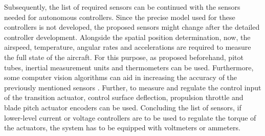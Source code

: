 Subsequently, the list of required sensors can be continued with the sensors needed for autonomous controllers.
Since the precise model used for these controllers is not developed, the proposed sensors might change after the detailed controller development.
Alongside the spatial position determination, now, the airspeed, temperature, angular rates and accelerations are required to measure the full state of the aircraft.
For this purpose, as proposed beforehand, pitot tubes, inertial measurement units and thermometers can be used.
Furthermore, some computer vision algorithms can aid in increasing the accuracy of the previously mentioned sensors \cite{fault_tolerant_compvis}.
Further, to measure and regulate the control input of the transition actuator, control surface deflection, propulsion throttle and blade pitch actuator encoders can be used.
Concluding the list of sensors, if lower-level current or voltage controllers are to be used to regulate the torque of the actuators, the system has to be equipped with voltmeters or ammeters.

